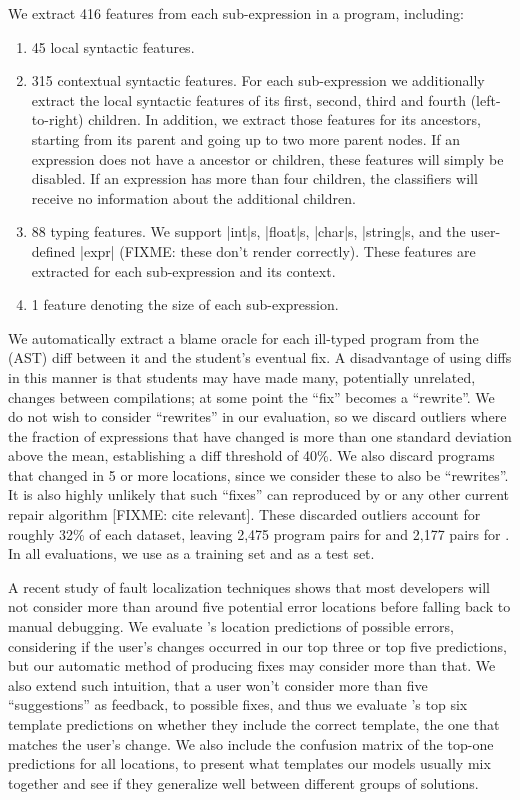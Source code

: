We extract 416 features from each sub-expression in a
program, including:
%
\begin{enumerate}
  \item 45 local syntactic features.
  \item 315 contextual syntactic features. For each sub-expression we
    additionally extract the local syntactic features of its first, second,
    third and fourth (left-to-right) children. In addition, we extract those
    features for its ancestors, starting from its parent and going up to two
    more parent nodes. If an expression does not have a ancestor or children,
    these features will simply be disabled. If an expression has more than four
    children, the classifiers will receive no information about the additional
    children.
  \item 88 typing features. We support |int|s, |float|s, |char|s, |string|s, and
    the user-defined |expr| (FIXME: these don't render correctly). These
    features are extracted for each
    sub-expression and its context.
  \item 1 feature denoting the size of each sub-expression.
\end{enumerate}

We automatically extract a blame oracle for each ill-typed program from the
(AST) diff between it and the student's eventual fix. A disadvantage of using
diffs in this manner is that students may have made many, potentially unrelated,
changes between compilations; at some point the ``fix'' becomes a ``rewrite''.
We do not wish to consider ``rewrites'' in our evaluation, so we discard
outliers where the fraction of expressions that have changed is more than one
standard deviation above the mean, establishing a diff threshold of 40\%. We
also discard programs that changed in 5 or more locations, since we consider
these to also be ``rewrites''. It
is also highly unlikely that such ``fixes'' can reproduced by \toolname or any
other current repair algorithm [FIXME: cite relevant].
These discarded outliers account for
roughly 32\% of each dataset, leaving 2,475 program pairs for \SPRING
and 2,177 pairs for \FALL. In all evaluations, we use \SPRING as a training
set and \FALL as a test set.

A recent study of fault localization techniques \citep[][]{Kochhar2016-oc} shows
that most developers will not consider more than around five potential error
locations before falling back to manual debugging. We evaluate \toolname's
location predictions of possible errors, considering if the user's changes
occurred in our top three or top five predictions, but our automatic method of
producing fixes may consider more than that. We also extend such intuition, that
a user won't consider more than five ``suggestions'' as feedback, to possible
fixes, and thus we evaluate \toolname's top six template predictions on whether
they include the correct template, \ie the one that matches the user's change. We also
include the confusion matrix of the top-one predictions for all locations,
to present what templates our models usually mix together and see if they
generalize well between different groups of solutions.


